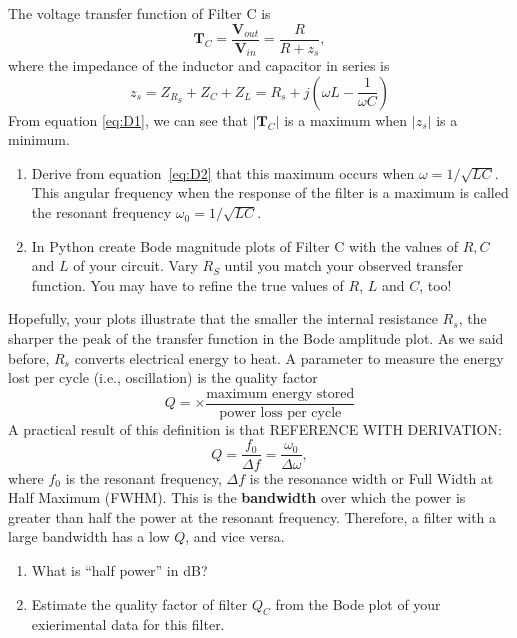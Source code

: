 \documentclass{article}
\begin{document}
The voltage transfer function of Filter C is
\begin{equation}
  \mathbf{T}_C=\frac{\mathbf{V}_{out}}{\mathbf{V}_{in}}=\frac{R}{R+z_s},
  \label{eq:D1}
\end{equation}
where the impedance of the inductor and capacitor in series is
\begin{equation}
  z_s=Z_{R_S}+ Z_C + Z_L = R_s+j\left(\omega L-\frac{1}{\omega  C}\right)
  \label{eq:D2}
\end{equation}
From equation \ref{eq:D1}, we can see that $|\mathbf{T}_C|$ is a maximum
when $|z_s|$ is a minimum.
\begin{enumerate}[resume]
\item Derive from equation~\ref{eq:D2} that this maximum occurs when
  $\omega=1/\sqrt{LC}$.  This angular frequency when the response of
  the filter is a maximum is called the resonant frequency
  $\omega_0 = 1/\sqrt{LC}$. %
\item In Python create Bode magnitude plots of Filter C with the
  values of $R,C$ and $L$ of your circuit. Vary $R_S$ until you match your
  observed transfer function. You may have to refine the true values
  of $R$, $L$ and $C$, too!
\end{enumerate}
Hopefully, your plots illustrate that the smaller the internal resistance
$R_s$, the sharper the peak of the transfer function in the Bode
amplitude plot. As we said before, $R_s$ converts electrical energy to
heat. A parameter to measure the energy lost per cycle (i.e.,
oscillation) is the quality factor
\begin{equation}
  Q = \times {\frac {\mbox{maximum energy stored}}{\mbox{power loss per cycle}}}
\end{equation}
A practical result of this definition is that {REFERENCE WITH
  DERIVATION}:
\begin{equation}
  Q =  \frac {f_0}{\Delta f}=\frac {\omega _0}{\Delta \omega },
  \label{eq:Q}
\end{equation}
where $f_0$ is the resonant frequency, $\Delta f$ is the resonance
width or Full Width at Half Maximum (FWHM). This is the {\bf
  bandwidth} over which the power is greater than half the power at
the resonant frequency. Therefore, a filter with a large bandwidth has
a low $Q$, and vice versa.

\begin{enumerate}[resume]
\item What is ``half power'' in dB?
\item Estimate the quality factor of filter $Q_C$ from the Bode plot
  of your exierimental data for this filter.
\end{enumerate}
\end{document}
